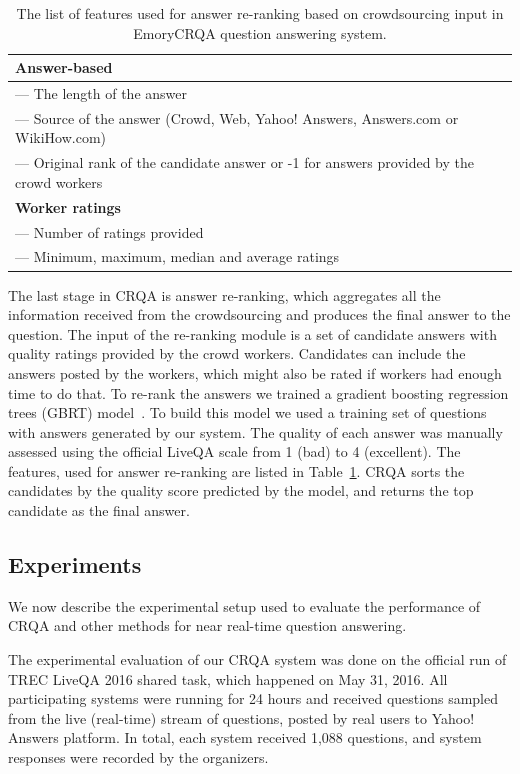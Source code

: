 \begin{table}[h]
\centering
\begin{tabular}{p{13cm}}
\textbf{Answer-based} \\
\hline
--- The length of the answer \\
--- Source of the answer (Crowd, Web, Yahoo! Answers, Answers.com or WikiHow.com)\\
--- Original rank of the candidate answer or -1 for answers provided by the crowd workers\\
\hline
\textbf{Worker ratings} \\
\hline
--- Number of ratings provided\\
--- Minimum, maximum, median and average ratings\\
\end{tabular}
\caption{The list of features used for answer re-ranking based on crowdsourcing input in EmoryCRQA question answering system.}
\label{table:non-factoid:crowdsourcing:crqa:reranking_features}
\end{table}

The last stage in CRQA is answer re-ranking, which aggregates all the information received from the crowdsourcing and produces the final answer to the question.
The input of the re-ranking module is a set of candidate answers with quality ratings provided by the crowd workers.
Candidates can include the answers posted by the workers, which might also be rated if workers had enough time to do that.
To re-rank the answers we trained a gradient boosting regression trees (GBRT) model~\cite{friedman2002stochastic}.
To build this model we used a training set of questions with answers generated by our system.
The quality of each answer was manually assessed using the official LiveQA scale from 1 (bad) to 4 (excellent).
The features, used for answer re-ranking are listed in Table~\ref{table:non-factoid:crowdsourcing:crqa:reranking_features}.
CRQA sorts the candidates by the quality score predicted by the model, and returns the top candidate as the final answer.


\subsection{Experiments}
\label{section:non-factoid:crowdsourcing:experiments}

We now describe the experimental setup used to evaluate the performance of CRQA and other methods for near real-time question answering.

The experimental evaluation of our CRQA system was done on the official run of TREC LiveQA 2016 shared task, which happened on May 31, 2016.
All participating systems were running for 24 hours and received questions sampled from the live (real-time) stream of questions, posted by real users to Yahoo! Answers platform.
In total, each system received 1,088 questions, and system responses were recorded by the organizers.

